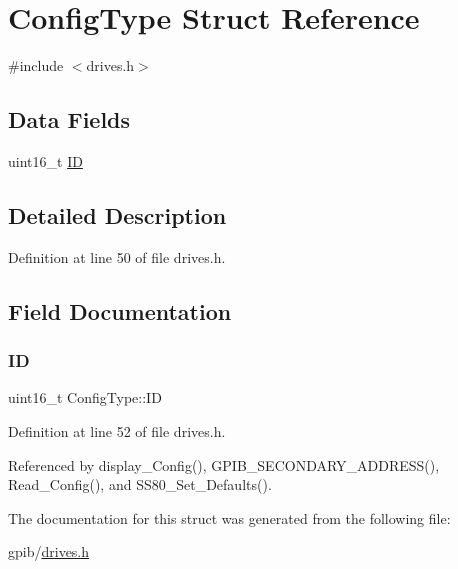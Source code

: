 \hypertarget{structConfigType}{}\section{Config\+Type Struct Reference}
\label{structConfigType}


{\ttfamily \#include $<$drives.\+h$>$}

\subsection*{Data Fields}
\begin{DoxyCompactItemize}
\item 
uint16\+\_\+t \hyperlink{structConfigType_a7d89346361dc0f06db0917c7ff37501a}{ID}
\end{DoxyCompactItemize}


\subsection{Detailed Description}


Definition at line 50 of file drives.\+h.



\subsection{Field Documentation}
\mbox{\label{structConfigType_a7d89346361dc0f06db0917c7ff37501a}} 
\subsubsection{\texorpdfstring{ID}{ID}}
{\footnotesize\ttfamily uint16\+\_\+t Config\+Type\+::\+ID}



Definition at line 52 of file drives.\+h.



Referenced by display\+\_\+\+Config(), G\+P\+I\+B\+\_\+\+S\+E\+C\+O\+N\+D\+A\+R\+Y\+\_\+\+A\+D\+D\+R\+E\+S\+S(), Read\+\_\+\+Config(), and S\+S80\+\_\+\+Set\+\_\+\+Defaults().



The documentation for this struct was generated from the following file\+:\begin{DoxyCompactItemize}
\item 
gpib/\hyperlink{drives_8h}{drives.\+h}\end{DoxyCompactItemize}
